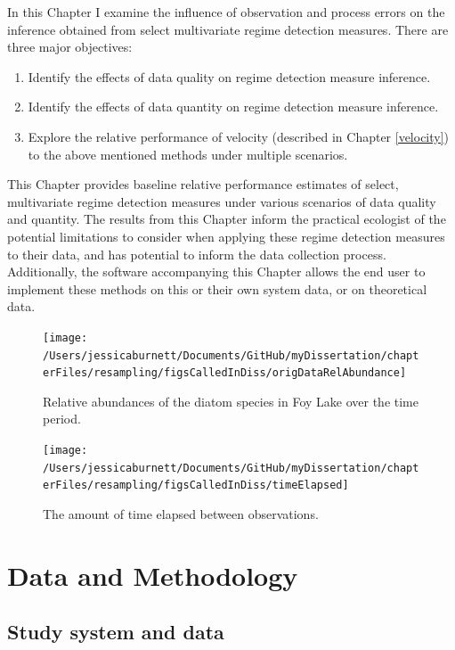 \documentclass[12pt,twoside,openany]{reedthesis}
\providecommand{\tightlist}{%
  \setlength{\itemsep}{0pt}\setlength{\parskip}{0pt}}
\begin{document}
In this Chapter I examine the influence of observation and process errors on the inference obtained from select multivariate regime detection measures. There are three major objectives:
\begin{enumerate}
\def\labelenumi{\arabic{enumi}.}
\tightlist
\item
  Identify the effects of data quality on regime detection measure inference.
\item
  Identify the effects of data quantity on regime detection measure inference.
\item
  Explore the relative performance of velocity (described in Chapter \ref{velocity}) to the above mentioned methods under multiple scenarios.
\end{enumerate}
This Chapter provides baseline relative performance estimates of select, multivariate regime detection measures under various scenarios of data quality and quantity. The results from this Chapter inform the practical ecologist of the potential limitations to consider when applying these regime detection measures to their data, and has potential to inform the data collection process. Additionally, the software accompanying this Chapter allows the end user to implement these methods on this or their own system data, or on theoretical data.
\begin{landscape}
\begin{figure}
\texttt{[image: /Users/jessicaburnett/Documents/GitHub/myDissertation/chapterFiles/resampling/figsCalledInDiss/origDataRelAbundance]} \caption{Relative abundances of the diatom species in Foy Lake over the time period.}\label{fig:origDat}
\end{figure}
\end{landscape}
\begin{figure}
\texttt{[image: /Users/jessicaburnett/Documents/GitHub/myDissertation/chapterFiles/resampling/figsCalledInDiss/timeElapsed]} \caption{The amount of time elapsed between observations.}\label{fig:timeElapsed}
\end{figure}
\hypertarget{data-and-methodology}{%
\section{Data and Methodology}\label{data-and-methodology}}

\hypertarget{study-system-and-data}{%
\subsection{Study system and data}\label{study-system-and-data}}
\end{document}
